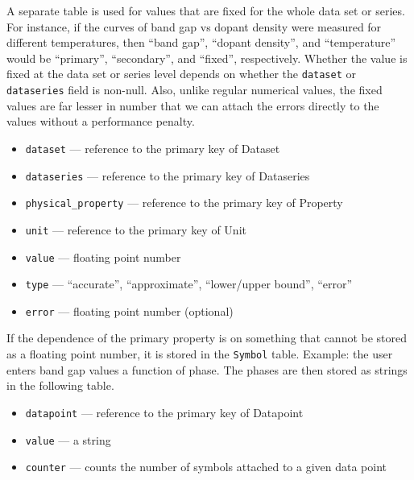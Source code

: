 \documentclass{article}
\begin{document}
A separate table is used for values that are fixed for the whole data set or series. For instance, if the curves of band gap vs dopant density were measured for different temperatures, then ``band gap'', ``dopant density'', and ``temperature'' would be ``primary'', ``secondary'', and ``fixed'', respectively. Whether the value is fixed at the data set or series level depends on whether the \texttt{dataset} or \texttt{dataseries} field is non-null. Also, unlike regular numerical values, the fixed values are far lesser in number that we can attach the errors directly to the values without a performance penalty.
\begin{tcolorbox}[colback=green!5,colframe=green!40!black,title=NumericalValueFixed(Base)]
  \begin{itemize}
  \item \texttt{dataset} --- reference to the primary key of Dataset
  \item \texttt{dataseries} --- reference to the primary key of Dataseries
  \item \texttt{physical\_property} --- reference to the primary key of Property
  \item \texttt{unit} --- reference to the primary key of Unit
  \item \texttt{value} --- floating point number
  \item \texttt{type} --- ``accurate'', ``approximate'', ``lower/upper bound'', ``error''
  \item \texttt{error} --- floating point number (optional)
  \end{itemize}
\end{tcolorbox}

If the dependence of the primary property is on something that cannot be stored as a floating point number, it is stored in the \texttt{Symbol} table. Example: the user enters band gap values a function of phase. The phases are then stored as strings in the following table.
\begin{tcolorbox}[colback=green!5,colframe=green!40!black,title=Symbol(Base)]
  \begin{itemize}
  \item \texttt{datapoint} --- reference to the primary key of Datapoint
  \item \texttt{value} --- a string
  \item \texttt{counter} --- counts the number of symbols attached to a given data point
  \end{itemize}
\end{tcolorbox}
\end{document}
